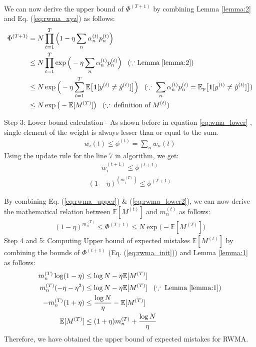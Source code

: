 \documentclass[11pt]{article}
\begin{document}
{\begin{align}
\end{align}
We can now derive the upper bound of $\Phi^{(T+1)}$ by combining Lemma \ref{lemma:2} and Eq. (\ref{eq:rwma_xyz}) as follows:
\begin{align}
    \Phi^{(T+1)}&=N\prod_{t=1}^{T}\Big(1-\eta\sum_n\alpha_n^{(t)}p_n^{(t)}\Big)\nonumber\\
    &\leq N\prod_{t=1}^T\exp{\Big(-\eta\sum_n\alpha_n^{(t)}p_n^{(t)}\Big)}\;\;\;(\because \text{Lemma}\;\ref{lemma:2})\nonumber\\
    &\leq N\exp{\Big(-\eta\sum_{t=1}^{T}\mathbb{E}\big[\textbf{1}[y^{(t)}\neq\hat{y}^{(t)}]\big]\Big)}\;\;\;(\because\;\sum_n\alpha_n^{(t)}p_n^{(t)}=\mathbb{E}_p\big[\textbf{1}[y^{(t)}\neq\hat{y}^{(t)}]\big])\nonumber\\
    &\leq N\exp{\big(-\mathbb{E}[M^{(T)}]\big)}\;\;\;(\because\;\text{definition of}\;M^{(t)})\label{eq:rwma_upper}
\end{align}

Step 3: Lower bound calculation - As shown before in equation \ref{eq:wma_lower} , single element of the weight is always lesser than or equal to the sum.
\begin{align}
    w_i{(t)} \leq \phi^{(t)}=\sum_n w_n{(t)} 
\end{align}
Using the update rule for the line 7 in algorithm, we get:
\begin{align}
    w_i^{(t+1)} \leq \phi^{(t+1)}
\end{align}
\begin{align}
    (1-\eta)^{(m_i^{(T)})} \leq \phi^{(T+1)} \label{eq:rwma_lower2}
\end{align}


By combining Eq. (\ref{eq:rwma_upper}) \& (\ref{eq:rwma_lower2}), we can now derive the mathematical relation between $\mathbb{E}[M^{(t)}]$ and $m_n^{(t)}$ as follows:
\begin{align}
    (1-\eta)^{m_n^{(T)}}\leq \Phi^{(T+1)} \leq N\exp{\big(-\mathbb{E}[M^{(T)}]\big)}\label{eq:rwma_init}
\end{align}
Step 4 and 5: Computing Upper bound of expected mistakes $\mathbb{E}[M^{(t)}]$ by combining the bounds of $\Phi^{(t+1)}$ (Eq. (\ref{eq:rwma_init})) and Lemma \ref{lemma:1} as follows:
\begin{align*}
    m_n^{(T)}\log(1-\eta) &\leq \log N - \eta\mathbb{E}[M^{(T)}]\\
    m_n^{(T)}(-\eta-\eta^2)&\leq \log N - \eta\mathbb{E}[M^{(T)}] \;\;\;(\because\; \text{Lemma}\;\ref{lemma:1})\\
    -m_n^{(T)}(1+\eta)&\leq\frac{\log N}{\eta} - \mathbb{E}[M^{(T)}]\\
    \mathbb{E}[M^{(T)}]&\leq (1+\eta)m_n^{(T)} + \frac{\log N}{\eta}
\end{align*}
Therefore, we have obtained the upper bound of expected mistakes for RWMA.
}
\end{document}

